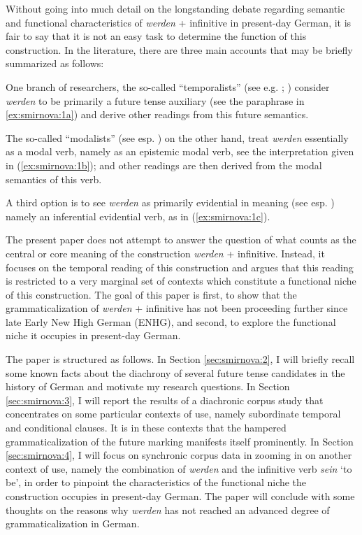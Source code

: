 \documentclass[output=paper,colorlinks,citecolor=brown]{langscibook}
\begin{document}
Without going into much detail on the longstanding debate regarding semantic and functional characteristics of \emph{werden} + infinitive in present-day German, it is fair to say that it is not an easy task to determine the function of this construction. In the literature, there are three main accounts that may be briefly summarized as follows:
\par One branch of researchers, the so-called “temporalists” (see e.g. \cite{MatzelUlvestad1982}; \cite{Thieroff1992}) consider \emph{werden} to be primarily a future tense auxiliary (see the paraphrase in \ref{ex:smirnova:1a}) and derive other readings from this future semantics. 
\par The so-called “modalists” (see esp. \cite{vater1975}) on the other hand, treat \emph{werden} essentially as a modal verb, namely as an epistemic modal verb, see the interpretation given in (\ref{ex:smirnova:1b}); and other readings are then derived from the modal semantics of this verb.
\par A third option is to see \emph{werden} as primarily evidential in meaning (see esp. \cite{DiewaldSmirnova2010}) namely an inferential evidential verb, as in (\ref{ex:smirnova:1c}). 
\par The present paper does not attempt to answer the question of what counts as the central or core meaning of the construction \emph{werden} + infinitive. Instead, it focuses on the temporal reading of this construction and argues that this reading is restricted to a very marginal set of contexts which constitute a functional niche of this construction. The goal of this paper is first, to show that the grammaticalization of \emph{werden} + infinitive has not been proceeding further since late Early New High German (ENHG), and second, to explore the functional niche it occupies in present-day German.

\par The paper is structured as follows. In Section \ref{sec:smirnova:2}, I will briefly recall some known facts about the diachrony of several future tense candidates in the history of German and motivate my research questions. In Section \ref{sec:smirnova:3}, I will report the results of a diachronic corpus study that concentrates on some particular contexts of use, namely subordinate temporal and conditional clauses. It is in these contexts that the hampered grammaticalization of the future marking manifests itself prominently. In Section \ref{sec:smirnova:4}, I will focus on synchronic corpus data in zooming in on another context of use, namely the combination of \emph{werden} and the infinitive verb \emph{sein} `to be', in order to pinpoint the characteristics of the functional niche the construction occupies in present-day German. The paper will conclude with some thoughts on the reasons why \emph{werden} has not reached an advanced degree of grammaticalization in German.
\end{document}
